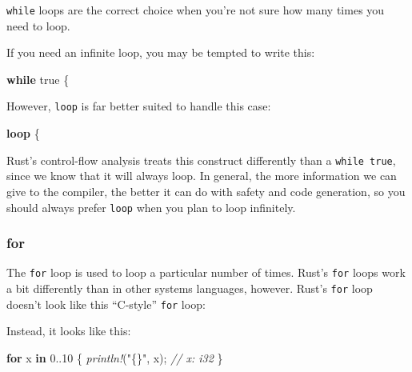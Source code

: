 \documentclass[a4paper,]{book}
\newenvironment{Shaded}{\begin{snugshade}}{\end{snugshade}}
\newcommand{\KeywordTok}[1]{\textcolor[rgb]{0.13,0.29,0.53}{\textbf{{#1}}}}
\newcommand{\DecValTok}[1]{\textcolor[rgb]{0.00,0.00,0.81}{{#1}}}
\newcommand{\ConstantTok}[1]{\textcolor[rgb]{0.00,0.00,0.00}{{#1}}}
\newcommand{\CharTok}[1]{\textcolor[rgb]{0.31,0.60,0.02}{{#1}}}
\newcommand{\StringTok}[1]{\textcolor[rgb]{0.31,0.60,0.02}{{#1}}}
\newcommand{\CommentTok}[1]{\textcolor[rgb]{0.56,0.35,0.01}{\textit{{#1}}}}
\newcommand{\PreprocessorTok}[1]{\textcolor[rgb]{0.56,0.35,0.01}{\textit{{#1}}}}
\newcommand{\NormalTok}[1]{{#1}}
\begin{document}
\texttt{while} loops are the correct choice when you're not sure how
many times you need to loop.

If you need an infinite loop, you may be tempted to write this:

\begin{Shaded}
\begin{Highlighting}[]
\KeywordTok{while} \ConstantTok{true} \NormalTok{\{}
\end{Highlighting}
\end{Shaded}

However, \texttt{loop} is far better suited to handle this case:

\begin{Shaded}
\begin{Highlighting}[]
\KeywordTok{loop} \NormalTok{\{}
\end{Highlighting}
\end{Shaded}

Rust's control-flow analysis treats this construct differently than a
\texttt{while\ true}, since we know that it will always loop. In
general, the more information we can give to the compiler, the better it
can do with safety and code generation, so you should always prefer
\texttt{loop} when you plan to loop infinitely.

\subsubsection{for}\label{for}

The \texttt{for} loop is used to loop a particular number of times.
Rust's \texttt{for} loops work a bit differently than in other systems
languages, however. Rust's \texttt{for} loop doesn't look like this
``C-style'' \texttt{for} loop:

\begin{Shaded}
\end{Shaded}

Instead, it looks like this:

\begin{Shaded}
\begin{Highlighting}[]
\KeywordTok{for} \NormalTok{x }\KeywordTok{in} \DecValTok{0.}\NormalTok{.}\DecValTok{10} \NormalTok{\{}
    \PreprocessorTok{println!}\NormalTok{(}\StringTok{"\{\}"}\NormalTok{, x); }\CommentTok{// x: i32}
\NormalTok{\}}
\end{Highlighting}
\end{Shaded}
\end{document}
